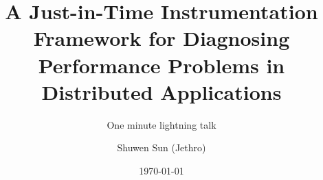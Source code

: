 \title[A Just-in-Time Inst. Framework]{A Just-in-Time Instrumentation Framework for Diagnosing Performance Problems in Distributed Applications}
\subtitle{One minute lightning talk}
\author{Shuwen Sun (Jethro)}
\date{\today}
\subject{One minute lightning talk}





